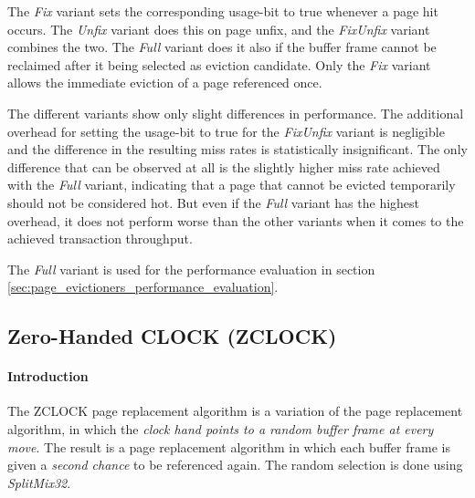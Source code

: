     The \emph{Fix} variant sets the corresponding usage-bit to true whenever a page hit occurs. The \emph{Unfix} variant does this on page unfix, and the \emph{FixUnfix} variant combines the two. The \emph{Full} variant does it also if the buffer frame cannot be reclaimed after it being selected as eviction candidate. Only the \emph{Fix} variant allows the immediate eviction of a page referenced once.

    The different variants show only slight differences in performance. The additional overhead for setting the usage-bit to true for the \emph{FixUnfix} variant is negligible and the difference in the resulting miss rates is statistically insignificant. The only difference that can be observed at all is the slightly higher miss rate achieved with the \emph{Full} variant, indicating that a page that cannot be evicted temporarily should not be considered hot. But even if the \emph{Full} variant has the highest overhead, it does not perform worse than the other variants when it comes to the achieved transaction throughput.

    The \emph{Full} variant is used for the performance evaluation in section \ref{sec:page_evictioners_performance_evaluation}.

\subsection[ZCLOCK]{Zero-Handed CLOCK (ZCLOCK)} \label{subsec:zclock}

\paragraph{Introduction}

    The ZCLOCK page replacement algorithm is a variation of the  page replacement algorithm, in which the \emph{clock hand points to a random buffer frame at every move}. The result is a  page replacement algorithm in which each buffer frame is given a \emph{second chance} to be referenced again. The random selection is done using \emph{SplitMix32}.

